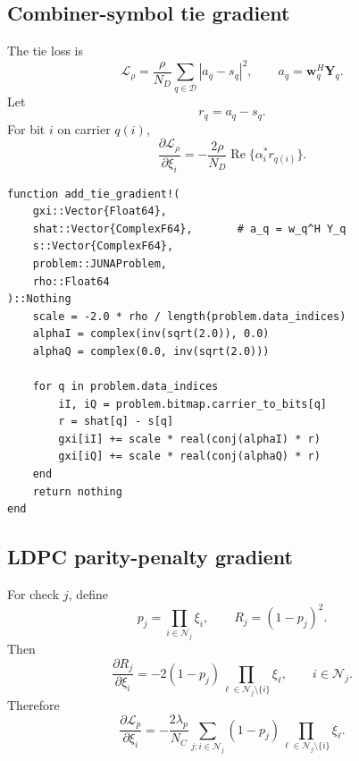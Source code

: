 \documentclass[11pt]{article}
\newcommand{\abs}[1]{\left\lvert #1 \right\rvert}
\newcommand{\re}{\operatorname{Re}}
\begin{document}
\subsection{Combiner-symbol tie gradient}

The tie loss is
\begin{equation}
\mathcal L_\rho
=\frac{\rho}{N_D}\sum_{q\in\mathcal D}\abs{a_q-s_q}^2,
\qquad
 a_q=\mathbf w_q^H\mathbf Y_q.
\end{equation}
Let
\begin{equation}
 r_q=a_q-s_q.
\end{equation}
For bit $i$ on carrier $q(i)$,
\begin{equation}
\frac{\partial \mathcal L_\rho}{\partial\xi_i}
=-\frac{2\rho}{N_D}\re\{\alpha_i^*r_{q(i)}\}.
\label{eq:grad_tie}
\end{equation}

\begin{lstlisting}
function add_tie_gradient!(
    gxi::Vector{Float64},
    shat::Vector{ComplexF64},       # a_q = w_q^H Y_q
    s::Vector{ComplexF64},
    problem::JUNAProblem,
    rho::Float64
)::Nothing
    scale = -2.0 * rho / length(problem.data_indices)
    alphaI = complex(inv(sqrt(2.0)), 0.0)
    alphaQ = complex(0.0, inv(sqrt(2.0)))

    for q in problem.data_indices
        iI, iQ = problem.bitmap.carrier_to_bits[q]
        r = shat[q] - s[q]
        gxi[iI] += scale * real(conj(alphaI) * r)
        gxi[iQ] += scale * real(conj(alphaQ) * r)
    end
    return nothing
end
\end{lstlisting}

\subsection{LDPC parity-penalty gradient}

For check $j$, define
\begin{equation}
 p_j=\prod_{i\in\mathcal N_j}\xi_i,
\qquad
R_j=(1-p_j)^2.
\end{equation}
Then
\begin{equation}
\frac{\partial R_j}{\partial\xi_i}
= -2(1-p_j)\prod_{\ell\in\mathcal N_j\setminus\{i\}}\xi_\ell,
\qquad i\in\mathcal N_j.
\end{equation}
Therefore
\begin{equation}
\frac{\partial\mathcal L_p}{\partial\xi_i}
= -\frac{2\lambda_p}{N_C}
\sum_{j:i\in\mathcal N_j}
(1-p_j)
\prod_{\ell\in\mathcal N_j\setminus\{i\}}\xi_\ell.
\label{eq:grad_parity}
\end{equation}
\end{document}
